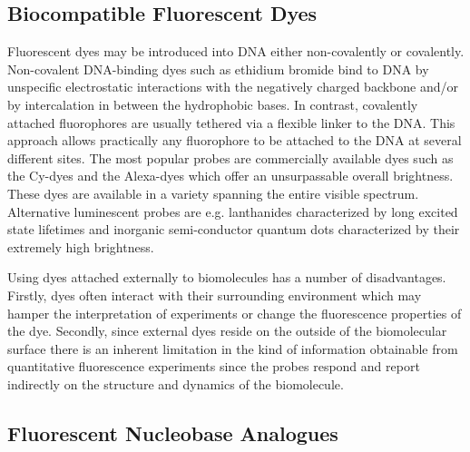 \subsection{Biocompatible Fluorescent Dyes}
 Fluorescent dyes may be introduced into DNA either non-covalently or covalently. Non-covalent DNA-binding dyes such as ethidium bromide bind to DNA by unspecific electrostatic interactions with the negatively charged backbone and/or by intercalation in between the hydrophobic bases.\cite{Ihmels2005,Armitage2005} In contrast, covalently attached fluorophores are usually tethered via a flexible linker to the DNA. This approach allows practically any fluorophore to be attached to the DNA at several different sites. The most popular probes are commercially available dyes such as the Cy-dyes and the Alexa-dyes which offer an unsurpassable overall brightness. These dyes are available in a variety spanning the entire visible spectrum.\cite{lifetechnologies} Alternative luminescent probes are e.g. lanthanides characterized by long excited state lifetimes\cite{Selvin2002} and inorganic semi-conductor quantum dots\cite{Giepmans2006,Medintz2005} characterized by their extremely high brightness.

 Using dyes attached externally to biomolecules has a number of disadvantages. Firstly, dyes often interact with their surrounding environment which may hamper the interpretation of experiments or change the fluorescence properties of the dye.\cite{Iqbal2008a,Neubauer2007,Norman2000,Sanborn2007,Sabanayagam2005a} Secondly, since external dyes reside on the outside of the biomolecular surface there is an inherent limitation in the kind of information obtainable from quantitative fluorescence experiments since the probes respond and report indirectly on the structure and dynamics of the biomolecule.

\subsection{Fluorescent Nucleobase Analogues}

